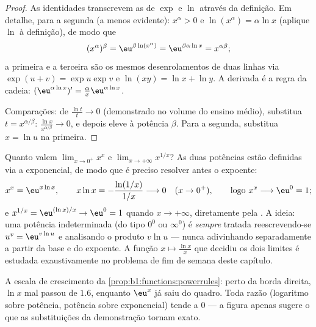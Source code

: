 \begin{proof}
As identidades transcrevem as de $\exp$ e $\ln$ através da
definição. Em detalhe, para a segunda (a menos evidente): $x^\alpha
> 0$ e $\ln(x^\alpha) = \alpha\ln x$ (aplique $\ln$ à
definição), de modo que
\[
(x^\alpha)^\beta = \eu^{\beta\ln(x^\alpha)}
= \eu^{\beta\alpha\ln x} = x^{\alpha\beta} ;
\]
a primeira e a terceira são os mesmos desenrolamentos de duas linhas via
$\exp(u + v) = \exp u\exp v$ e $\ln(xy) = \ln x + \ln y$. A
derivada é a regra da cadeia: $(\eu^{\alpha\ln x})' =
\frac{\alpha}{x} \eu^{\alpha\ln x}$.

Comparações: de $\frac{\ln t}{t} \to 0$ (demonstrado no volume do
ensino médio), substitua $t = x^{\alpha/\beta}$:
$\frac{\ln x}{x^{\alpha/\beta}} \to 0$, e depois eleve à potência
$\beta$. Para a segunda, substitua $x = \ln u$ na primeira.
\end{proof}

\begin{example}\label{ex:b1:functions:xx}
Quanto valem $\lim_{x \to 0^+} x^x$ e $\lim_{x \to +\infty}
x^{1/x}$? As duas potências estão definidas via a exponencial, de modo
que é preciso resolver antes o expoente:
\[
x^x = \eu^{x\ln x}, \qquad
x\ln x = -\frac{\ln(1/x)}{1/x} \longrightarrow 0
\quad (x \to 0^+),
\qquad\text{logo } x^x \longrightarrow \eu^0 = 1 ;
\]
e $x^{1/x} = \eu^{(\ln x)/x} \to \eu^0 = 1$ quando $x \to +\infty$,
diretamente pela . A ideia: uma potência
indeterminada (do tipo $0^0$ ou $\infty^0$) é \emph{sempre} tratada
reescrevendo-se $u^v = \eu^{v\ln u}$ e analisando o produto $v \ln u$
--- nunca adivinhando separadamente a partir da base e do expoente. A
função $x \mapsto \frac{\ln x}{x}$ que decidiu os dois limites é
estudada exaustivamente no problema de fim de semana deste capítulo.
\end{example}

\begin{omfigure}

{\small A escala de crescimento da
\cref{prop:b1:functions:powerrules}: perto da borda direita, $\ln x$
mal passou de $1.6$, enquanto $\eu^x$ já saiu do quadro. Toda
razão (logaritmo sobre potência, potência sobre exponencial) tende a $0$
--- a figura apenas sugere o que as substituições da demonstração tornam
exato.}
\end{omfigure}


